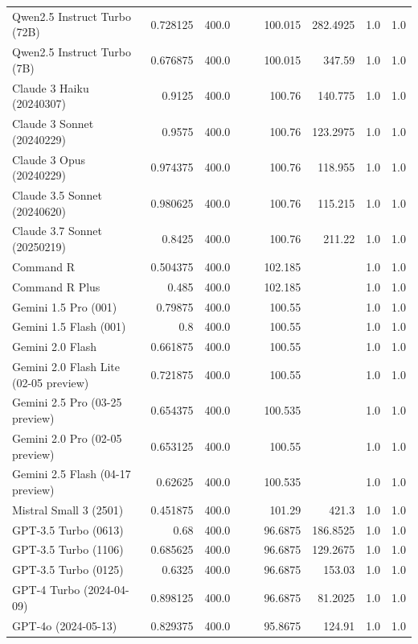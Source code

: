 \begin{table}[htp]
{\begin{tabular}{lrrrrrrrr}
Qwen2.5 Instruct Turbo (72B) & 0.728125 & 400.0 &  &  & 100.015 & 282.4925 & 1.0 & 1.0 \\
Qwen2.5 Instruct Turbo (7B) & 0.676875 & 400.0 &  &  & 100.015 & 347.59 & 1.0 & 1.0 \\
Claude 3 Haiku (20240307) & 0.9125 & 400.0 &  &  & 100.76 & 140.775 & 1.0 & 1.0 \\
Claude 3 Sonnet (20240229) & 0.9575 & 400.0 &  &  & 100.76 & 123.2975 & 1.0 & 1.0 \\
Claude 3 Opus (20240229) & 0.974375 & 400.0 &  &  & 100.76 & 118.955 & 1.0 & 1.0 \\
Claude 3.5 Sonnet (20240620) & 0.980625 & 400.0 &  &  & 100.76 & 115.215 & 1.0 & 1.0 \\
Claude 3.7 Sonnet (20250219) & 0.8425 & 400.0 &  &  & 100.76 & 211.22 & 1.0 & 1.0 \\
Command R & 0.504375 & 400.0 &  &  & 102.185 &  & 1.0 & 1.0 \\
Command R Plus & 0.485 & 400.0 &  &  & 102.185 &  & 1.0 & 1.0 \\
Gemini 1.5 Pro (001) & 0.79875 & 400.0 &  &  & 100.55 &  & 1.0 & 1.0 \\
Gemini 1.5 Flash (001) & 0.8 & 400.0 &  &  & 100.55 &  & 1.0 & 1.0 \\
Gemini 2.0 Flash & 0.661875 & 400.0 &  &  & 100.55 &  & 1.0 & 1.0 \\
Gemini 2.0 Flash Lite (02-05 preview) & 0.721875 & 400.0 &  &  & 100.55 &  & 1.0 & 1.0 \\
Gemini 2.5 Pro (03-25 preview) & 0.654375 & 400.0 &  &  & 100.535 &  & 1.0 & 1.0 \\
Gemini 2.0 Pro (02-05 preview) & 0.653125 & 400.0 &  &  & 100.55 &  & 1.0 & 1.0 \\
Gemini 2.5 Flash (04-17 preview) & 0.62625 & 400.0 &  &  & 100.535 &  & 1.0 & 1.0 \\
Mistral Small 3 (2501) & 0.451875 & 400.0 &  &  & 101.29 & 421.3 & 1.0 & 1.0 \\
GPT-3.5 Turbo (0613) & 0.68 & 400.0 &  &  & 96.6875 & 186.8525 & 1.0 & 1.0 \\
GPT-3.5 Turbo (1106) & 0.685625 & 400.0 &  &  & 96.6875 & 129.2675 & 1.0 & 1.0 \\
GPT-3.5 Turbo (0125) & 0.6325 & 400.0 &  &  & 96.6875 & 153.03 & 1.0 & 1.0 \\
GPT-4 Turbo (2024-04-09) & 0.898125 & 400.0 &  &  & 96.6875 & 81.2025 & 1.0 & 1.0 \\
GPT-4o (2024-05-13) & 0.829375 & 400.0 &  &  & 95.8675 & 124.91 & 1.0 & 1.0 \\

\end{tabular}}
\end{table}
